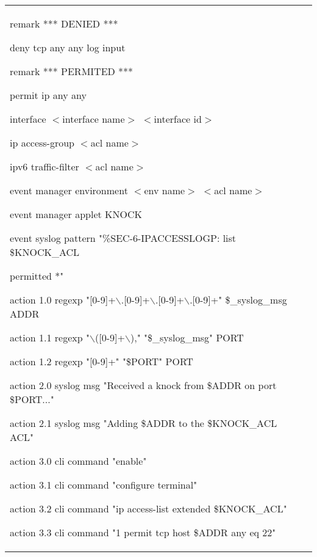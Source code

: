 \begin{longtable}[!htbp]{|L{10em}L{10em}>{\selectfont}L{34em}|}
	\hspace{0.5em}remark *** DENIED ***
	
	\hspace{0.5em}deny   tcp any any log input
	
	\hspace{0.5em}remark *** PERMITED ***
	
	\hspace{0.5em}permit ip any any
	
	
	interface $<$interface name$>$ $<$interface id$>$
	
	\hspace{0.5em}ip access-group $<$acl name$>$
	
	\hspace{0.5em}ipv6 traffic-filter $<$acl name$>$
	
	event manager environment $<$env name$>$ $<$acl name$>$
	
	event manager applet KNOCK
	
	\hspace{0.5em}event syslog pattern "\%SEC-6-IPACCESSLOGP: list \$KNOCK\_ACL
	
	\hspace{1em}permitted *"
	
	\hspace{0.5em}action 1.0 regexp "[0-9]+$\backslash$.[0-9]+$\backslash$.[0-9]+$\backslash$.[0-9]+" \$\_syslog\_msg ADDR
	
	\hspace{0.5em}action 1.1 regexp "$\backslash$([0-9]+$\backslash$)," "\$\_syslog\_msg" PORT
	
	\hspace{0.5em}action 1.2 regexp "[0-9]+" "\$PORT" PORT 
	
	\hspace{0.5em}action 2.0 syslog msg "Received a knock from \$ADDR on port \$PORT..."
	
	\hspace{0.5em}action 2.1 syslog msg "Adding \$ADDR to the \$KNOCK\_ACL ACL"
	
	\hspace{0.5em}action 3.0 cli command "enable"
	
	\hspace{0.5em}action 3.1 cli command "configure terminal"
	
	\hspace{0.5em}action 3.2 cli command "ip access-list extended \$KNOCK\_ACL"
	
	\hspace{0.5em}action 3.3 cli command "1 permit tcp host \$ADDR any eq 22"
	

\end{longtable}

